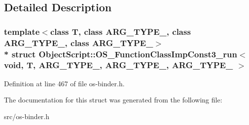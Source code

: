 \subsection{Detailed Description}
\subsubsection*{template$<$class T, class A\+R\+G\+\_\+\+T\+Y\+P\+E\+\_, class A\+R\+G\+\_\+\+T\+Y\+P\+E\+\_, class A\+R\+G\+\_\+\+T\+Y\+P\+E\+\_$>$\\*
struct Object\+Script\+::\+O\+S\+\_\+\+Function\+Class\+Imp\+Const3\+\_\+run$<$ void, T,   A\+R\+G\+\_\+\+T\+Y\+P\+E\+\_, A\+R\+G\+\_\+\+T\+Y\+P\+E\+\_, A\+R\+G\+\_\+\+T\+Y\+P\+E\+\_ $>$}



Definition at line 467 of file os-\/binder.\+h.



The documentation for this struct was generated from the following file\+:\begin{DoxyCompactItemize}
\item 
src/os-\/binder.\+h\end{DoxyCompactItemize}
